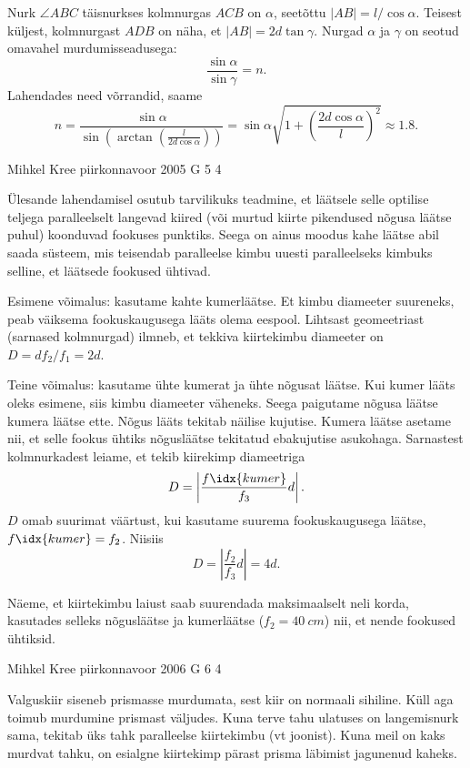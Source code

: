\documentclass[11pt]{article}
\begin{document}
{{Nurk $\angle ABC$ täisnurkses kolmnurgas $ACB$ on $\alpha$, seetõttu $|AB| = l/ \cos \alpha$. Teisest küljest, kolmnurgast $ADB$ on näha, et $|AB| = 2d \tan \gamma$. Nurgad $\alpha$ ja $\gamma$ on seotud omavahel murdumisseadusega:
\[
\frac{\sin\alpha}{\sin\gamma} = n.
\]
Lahendades need võrrandid, saame
\[
n=\frac{\sin\alpha}{\sin\left(\arctan\left(\frac{l}{2d\cos\alpha}\right)\right)} =\sin \alpha \sqrt{1+\left(\frac{2 d \cos \alpha}{l}\right)^{2}} \approx \num{1,8}.
\]
\fi
}

{Mihkel Kree} %
{piirkonnavoor} %
{2005} %
{G 5} %
{4} %
{

\ifSolution
Ülesande lahendamisel osutub tarvilikuks teadmine, et läätsele selle optilise teljega paralleelselt langevad kiired (või murtud kiirte pikendused nõgusa läätse puhul) koonduvad fookuses punktiks. Seega on ainus moodus kahe läätse abil saada süsteem, mis teisendab paralleelse kimbu uuesti paralleelseks kimbuks selline, et läätsede fookused ühtivad. 

Esimene võimalus: kasutame kahte kumerläätse. Et kimbu diameeter suureneks, peab väiksema fookuskaugusega lääts olema eespool. Lihtsast geomeetriast (sarnased kolmnurgad) ilmneb, et tekkiva kiirtekimbu diameeter on $D = df_2/f_1 = 2d$.

Teine võimalus: kasutame ühte kumerat ja ühte nõgusat läätse. Kui kumer lääts oleks esimene, siis kimbu diameeter väheneks. Seega paigutame nõgusa läätse kumera läätse ette. Nõgus lääts tekitab näilise kujutise. Kumera läätse asetame nii, et selle fookus ühtiks nõgusläätse tekitatud ebakujutise asukohaga. Sarnastest kolmnurkadest leiame, et tekib kiirekimp diameetriga
\[
D = \left|\frac{f\idx{kumer}}{f_3}d\right|.
\]
$D$ omab suurimat väärtust, kui kasutame suurema fookuskaugusega läätse, $f\idx{kumer} = f_2$. Niisiis
\[
D = \left|\frac{f_2}{f_3}d\right| = 4d.
\]


Näeme, et kiirtekimbu laiust saab suurendada maksimaalselt neli korda, kasutades selleks nõgusläätse ja kumerläätse ($f_2 = \SI{40}{cm}$) nii, et nende fookused ühtiksid.
\fi
}

{Mihkel Kree} %
{piirkonnavoor} %
{2006} %
{G 6} %
{4} %
{

\ifSolution
Valguskiir siseneb prismasse murdumata, sest kiir on normaali sihiline. Küll aga toimub murdumine prismast väljudes. Kuna terve tahu ulatuses on langemisnurk sama, tekitab üks tahk paralleelse kiirtekimbu (vt joonist). Kuna meil on kaks murdvat tahku, on esialgne kiirtekimp pärast prisma läbimist jagunenud kaheks.

}}
\end{document}
